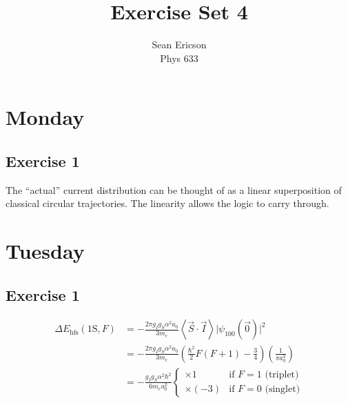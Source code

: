 \documentclass[12pt]{article}
\newcommand{\magsq}[1]{\big|#1\big|^2}
\newcommand{\avg}[1]{\left<#1\right>}
\begin{document}
	
\title{Exercise Set 4}
\author{Sean Ericson \\ Phys 633}
\maketitle

\section*{Monday}
\subsection*{Exercise 1}
The ``actual'' current distribution can be thought of as a linear superposition of classical circular trajectories. The linearity allows the logic to carry through.


\section*{Tuesday}
\subsection*{Exercise 1}
\begin{align*}
    \Delta E_\text{hfs}(\text{1S},F) & = -\frac{2\pi g_I g_S \alpha^2 a_0}{3m_e}\avg{\vec{S}\cdot\vec{I}}\magsq{\psi_{100}(\vec{0})} \\
    &= -\frac{2\pi g_I g_S \alpha^2 a_0}{3m_e}\left(\frac{\hbar^2}{2}F(F+1)-\frac{3}{4}\right)\left(\frac{1}{\pi a_0^3}\right) \\
    &= -\frac{g_I g_S \alpha^2 \hbar^2}{6m_e a_0^2} \begin{cases}
        \times 1 & \text{if $F = 1$ (triplet)} \\
        \times (-3) & \text{if $F = 0$ (singlet)}
      \end{cases}
\end{align*}
\end{document}
